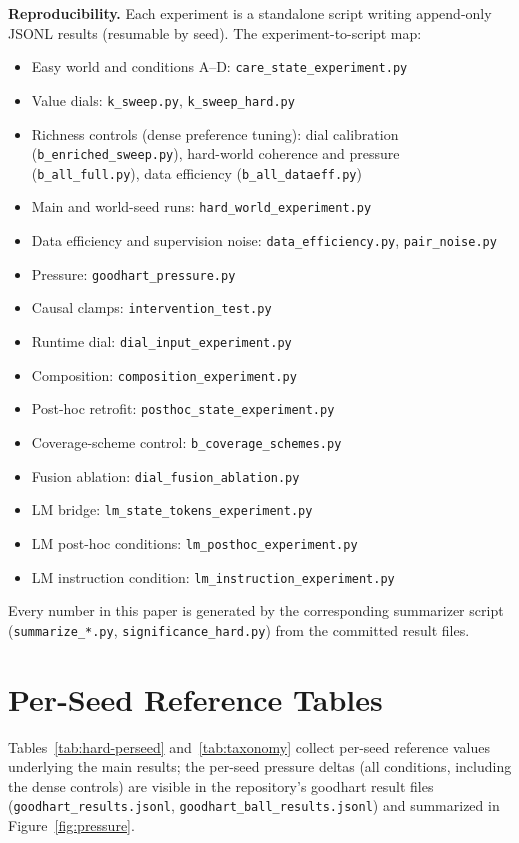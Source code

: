 \documentclass[11pt]{article}
\begin{document}
\textbf{Reproducibility.} Each experiment is a standalone script writing append-only
JSONL results (resumable by seed). The experiment-to-script map:
\begin{itemize}
\item Easy world and conditions A--D: \texttt{care\_state\_experiment.py}
\item Value dials: \texttt{k\_sweep.py}, \texttt{k\_sweep\_hard.py}
\item Richness controls (dense preference tuning): dial calibration
  (\texttt{b\_enriched\_sweep.py}), hard-world coherence and pressure
  (\texttt{b\_all\_full.py}), data efficiency (\texttt{b\_all\_dataeff.py})
\item Main and world-seed runs: \texttt{hard\_world\_experiment.py}
\item Data efficiency and supervision noise: \texttt{data\_efficiency.py}, \texttt{pair\_noise.py}
\item Pressure: \texttt{goodhart\_pressure.py}
\item Causal clamps: \texttt{intervention\_test.py}
\item Runtime dial: \texttt{dial\_input\_experiment.py}
\item Composition: \texttt{composition\_experiment.py}
\item Post-hoc retrofit: \texttt{posthoc\_state\_experiment.py}
\item Coverage-scheme control: \texttt{b\_coverage\_schemes.py}
\item Fusion ablation: \texttt{dial\_fusion\_ablation.py}
\item LM bridge: \texttt{lm\_state\_tokens\_experiment.py}
\item LM post-hoc conditions: \texttt{lm\_posthoc\_experiment.py}
\item LM instruction condition: \texttt{lm\_instruction\_experiment.py}
\end{itemize}
Every number in this paper is generated by the corresponding summarizer script
(\texttt{summarize\_*.py}, \texttt{significance\_hard.py}) from the committed result files.

\section{Per-Seed Reference Tables}
\label{app:perseeds}

Tables~\ref{tab:hard-perseed} and~\ref{tab:taxonomy} collect per-seed reference values
underlying the main results; the per-seed pressure deltas (all conditions, including the dense
controls) are visible in the repository's goodhart result files
(\texttt{goodhart\_results.jsonl}, \texttt{goodhart\_ball\_results.jsonl}) and summarized
in Figure~\ref{fig:pressure}.
\end{document}
